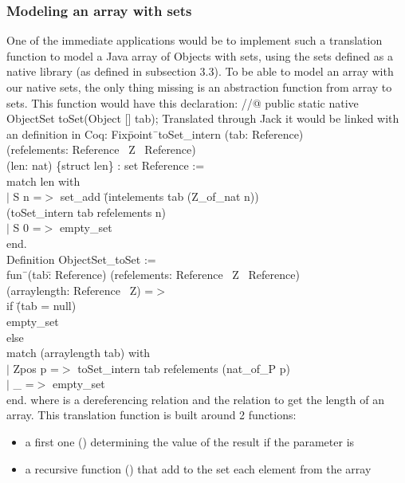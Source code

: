\subsubsection{Modeling an array with sets}
One of the immediate applications would be to implement such 
a translation function to model a Java array of Objects with sets, 
using the sets defined as a native library 
(as defined in subsection 3.3).
To be able to model an array with our native sets, the only thing missing is
an abstraction function from array to sets. 
This function would have this declaration:
\btab
//@ public static native ObjectSet toSet(Object [] tab);
\etab
Translated through Jack it would be linked with an  
definition in Coq:
\btab
Fix\=point\= \ toSet\_intern (tab: Reference)\\ 
\>(refelements: Reference \rarrow \ Z  \rarrow \ Reference)\+\\
\>(len: nat) \{struct len\} : set Reference :=\\
match len with\\
$|$ S n =$>$ set\_add \=(intelements tab (Z\_of\_nat n)) \\
\>(toSet\_intern tab refelements n)\\
$|$ S 0 =$>$ empty\_set\\
end.\-\\
Definition ObjectSet\_toSet :=\+\\ 
fun\= \ (tab\=: Reference) 
(refelements: Reference \rarrow \ Z  \rarrow \ Reference) \+\\ \>
(arraylength: Reference \rarrow \ Z) =$>$ \\
if \=(tab = null)\\
 \> empty\_set\\
  else \+\\
match (arraylength tab) with\\
$|$ Zpos p =$>$ toSet\_intern tab refelements (nat\_of\_P p)\\
$|$ \_ =$>$ empty\_set\\
end.
\etab
where  is a dereferencing relation and  
the relation to get the length of an array. 
This translation function is built around 2 functions:
\begin{itemize}
\item a first one () determining the value of 
the result if the  parameter is  
\item a recursive function () that add to 
the set each element from the array
\end{itemize}
